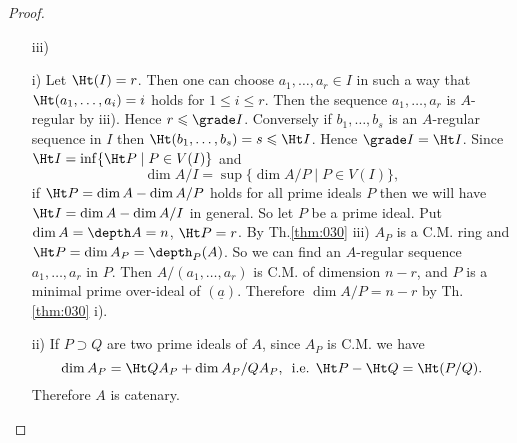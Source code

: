 \documentclass[../main]{subfiles}
\begin{document}
\begin{proof}\phantom{,}
\begin{enumerate}
    \item[iii)]
    \item[i)] Let $\Ht(I)=r$. Then one can choose $a_1, \ldots, a_r \in I$ in such a way that $\Ht (a_1, \ldots, a_i)=i$ holds for $1 \leqslant i \leqslant r$. Then the sequence $a_1, \ldots, a_r$ is $A$-regular by iii). Hence $r \leqslant\grade I$. Conversely if $b_1, \ldots, b_s$ is an $A$-regular sequence in $I$ then $\Ht(b_1, \ldots, b_s)=s \leqslant \Ht I$. Hence $\grade I= \Ht I$. Since $\Ht I=\inf\{\Ht P \mid P \in V(I)\}$ and \[\dim A / I=\sup \{\dim A / P \mid P \in V(I)\},\] if $\Ht P=\dim A-\dim A / P$ holds for all prime ideals $P$ then we will have $\Ht I=\dim A-\dim A/I$ in general. So let $P$ be a prime ideal. Put $\dim A=\depth A=n$, $\Ht P=r$. By Th.\ref{thm:030} iii) $A_P$ is a C.M. ring and $\Ht P=\dim A_P=\depth_P(A)$. So we can find an $A$-regular sequence $a_1, \ldots, a_r$ in $P$. Then $A /(a_1, \ldots, a_r)$ is C.M. of dimension $n-r$, and $P$ is a minimal prime over-ideal of $(\underline{a})$. Therefore $\dim A / P=n-r$ by Th.\ref{thm:030} i).
    \item[ii)] If $P \supset Q$ are two prime ideals of $A$, since $A_P$ is C.M. we have \[\dim A_P=\Ht QA_P+\dim A_P / Q A_P,\, \text{ i.e. } \Ht P-\Ht Q=\Ht(P / Q).\] Therefore $A$ is catenary.
\end{enumerate}

\end{proof}
\end{document}
